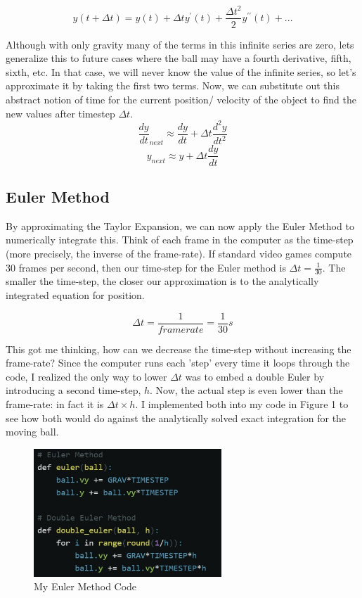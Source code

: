 \documentclass[12pt]{article}
\begin{document}
$$y(t+\Delta t) = y(t) + \Delta t y^\prime(t) + \frac{\Delta t^2}{2}y^{\prime \prime}(t) + ...$$

Although with only gravity many of the terms in this infinite series are zero, lets generalize this to future cases where the ball may have a fourth derivative, fifth, sixth, etc. In that case, we will never know the value of the infinite series, so let's approximate it by taking the first two terms. Now, we can substitute out this abstract notion of time for the current position/ velocity of the object to find the new values after timestep $\Delta t$. 
$$\frac{dy}{dt}_{next} \approx \frac{dy}{dt} + \Delta t \frac{d^2y}{dt^2}$$
$$y_{next} \approx y + \Delta t \frac{dy}{dt}$$

\subsection{Euler Method}
By approximating the Taylor Expansion, we can now apply the Euler Method to numerically integrate this. Think of each frame in the computer as the time-step (more precisely, the inverse of the frame-rate). If standard video games compute 30 frames per second, then our time-step for the Euler method is $\Delta t = \frac{1}{30}.$ The smaller the time-step, the closer our approximation is to the analytically integrated equation for position. 

$$\Delta t = \frac{1}{framerate} = \frac{1}{30}s$$

This got me thinking, how can we decrease the time-step without increasing the frame-rate? Since the computer runs each 'step' every time it loops through the code, I realized the only way to lower $\Delta t$ was to embed a double Euler by introducing a second time-step, $h$. Now, the actual step is even lower than the frame-rate: in fact it is $\Delta t \times h$. I implemented both into my code in Figure 1 to see how both would do against the analytically solved exact integration for the moving ball.

\begin{figure}[H]
\centering
\includegraphics[width=200pt]{img/euler_code.jpg}
\caption{\label{fig:1}My Euler Method Code}
\end{figure}
\end{document}
